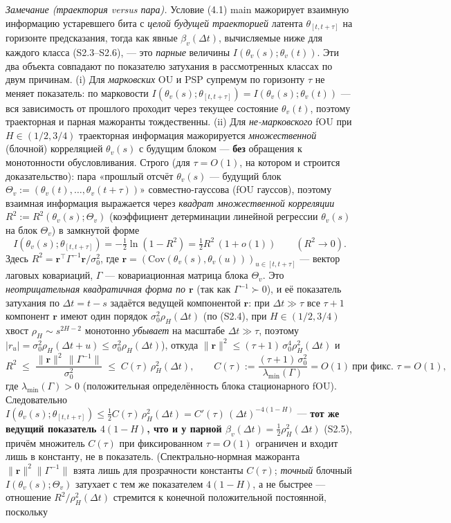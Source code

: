 \documentclass[12pt]{iopart}
\begin{document}
\emph{Замечание (траектория versus пара).} Условие (4.1) main мажорирует взаимную информацию устаревшего бита с \emph{целой будущей траекторией} латента \(\theta_{[t,t+\tau]}\) на горизонте предсказания, тогда как явные \(\beta_v(\Delta t)\), вычисляемые ниже для каждого класса (S2.3--S2.6), --- это \emph{парные} величины \(I(\theta_v(s);\theta_v(t))\). Эти два объекта совпадают по показателю затухания в рассмотренных классах по двум причинам. (i) Для \emph{марковских} OU и PSP супремум по горизонту \(\tau\) не меняет показатель: по марковости \(I(\theta_v(s);\theta_{[t,t+\tau]}) = I(\theta_v(s);\theta_v(t))\) --- вся зависимость от прошлого проходит через текущее состояние \(\theta_v(t)\), поэтому траекторная и парная мажоранты тождественны. (ii) Для \emph{не-марковского} fOU при \(H \in (1/2, 3/4)\) траекторная информация мажорируется \emph{множественной} (блочной) корреляцией \(\theta_v(s)\) с будущим блоком --- \textbf{без} обращения к монотонности обусловливания. Строго (для \(\tau = O(1)\), на котором и строится доказательство): пара «прошлый отсчёт \(\theta_v(s)\) --- будущий блок \(\Theta_v := (\theta_v(t),\dots,\theta_v(t+\tau))\)» совместно-гауссова (fOU гауссов), поэтому взаимная информация выражается через \emph{квадрат множественной корреляции} \(R^2 := R^2(\theta_v(s);\Theta_v)\) (коэффициент детерминации линейной регрессии \(\theta_v(s)\) на блок \(\Theta_v\)) в замкнутой форме \[I(\theta_v(s);\theta_{[t,t+\tau]}) = -\tfrac12\ln(1-R^2) = \tfrac12 R^2\,(1+o(1)) \qquad (R^2 \to 0).\] Здесь \(R^2 = \mathbf r^\top \Gamma^{-1}\mathbf r/\sigma_0^2\), где \(\mathbf r = (\mathrm{Cov}(\theta_v(s),\theta_v(u)))_{u\in[t,t+\tau]}\) --- вектор лаговых ковариаций, \(\Gamma\) --- ковариационная матрица блока \(\Theta_v\). Это \emph{неотрицательная квадратичная форма по \(\mathbf r\)} (так как \(\Gamma^{-1}\succ0\)), и её показатель затухания по \(\Delta t = t-s\) задаётся ведущей компонентой \(\mathbf r\): при \(\Delta t \gg \tau\) все \(\tau+1\) компонент \(\mathbf r\) имеют один порядок \(\sigma_0^2\rho_H(\Delta t)\) (по (S2.4), при \(H \in (1/2,3/4)\) хвост \(\rho_H \sim s^{2H-2}\) монотонно \emph{убывает} на масштабе \(\Delta t \gg \tau\), поэтому \(|r_u| = \sigma_0^2\rho_H(\Delta t + u) \le \sigma_0^2\rho_H(\Delta t)\)), откуда \(\|\mathbf r\|^2 \le (\tau+1)\,\sigma_0^4\rho_H^2(\Delta t)\) и \[R^2 \;\le\; \frac{\|\mathbf r\|^2\,\|\Gamma^{-1}\|}{\sigma_0^2} \;\le\; C(\tau)\,\rho_H^2(\Delta t), \qquad C(\tau) := \frac{(\tau+1)\,\sigma_0^2}{\lambda_{\min}(\Gamma)} = O(1)\ \text{при фикс. } \tau=O(1),\] где \(\lambda_{\min}(\Gamma) > 0\) (положительная определённость блока стационарного fOU). Следовательно \(I(\theta_v(s);\theta_{[t,t+\tau]}) \le \tfrac12 C(\tau)\,\rho_H^2(\Delta t) = C'(\tau)\,(\Delta t)^{-4(1-H)}\) --- \textbf{тот же ведущий показатель \(4(1-H)\), что и у парной \(\beta_v(\Delta t) = \tfrac12\rho_H^2(\Delta t)\)} (S2.5), причём множитель \(C(\tau)\) при фиксированном \(\tau = O(1)\) ограничен и входит лишь в константу, не в показатель. (Спектрально-нормная мажоранта \(\|\mathbf r\|^2\|\Gamma^{-1}\|\) взята лишь для прозрачности константы \(C(\tau)\); \emph{точный} блочный \(I(\theta_v(s);\Theta_v)\) затухает с тем же показателем \(4(1-H)\), а не быстрее --- отношение \(R^2/\rho_H^2(\Delta t)\) стремится к конечной положительной постоянной, поскольку 
\end{document}
